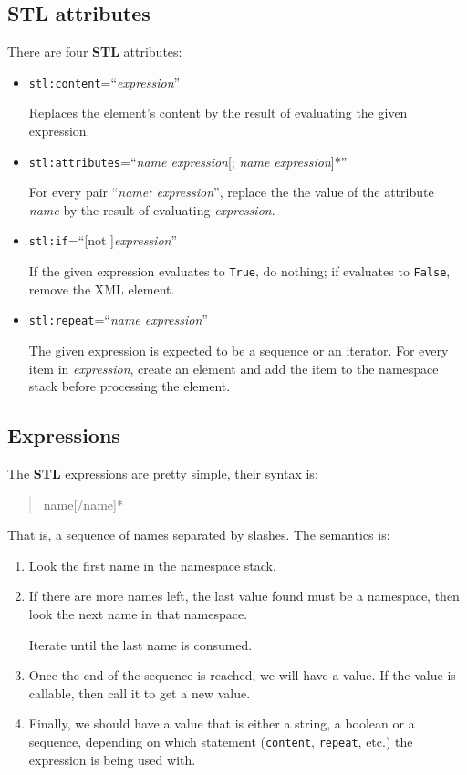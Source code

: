 \subsection{STL attributes}

There are four {\bf STL} attributes:

\begin{itemize}
  \item {\tt stl:content}=``{\em expression}''

    Replaces the element's
    content by the result of evaluating the given expression.

  \item {\tt stl:attributes}=``{\em name expression}[; {\em name expression}]*''

    For every pair ``{\em name: expression}'', replace the the value of
    the attribute {\em name} by the result of evaluating {\em expression}.

  \item {\tt stl:if}=``[not ]{\em expression}''

    If the given expression evaluates to {\tt True}, do nothing; if
    evaluates to {\tt False}, remove the XML element.

  \item {\tt stl:repeat}=``{\em name expression}''

    The given expression is expected to be a sequence or an iterator.
    For every item in {\em expression}, create an element and add the
    item to the namespace stack before processing the element.
\end{itemize}


\subsection{Expressions}

The {\bf STL} expressions are pretty simple, their syntax is:

\begin{quote}
    name[/name]*
\end{quote}

That is, a sequence of names separated by slashes. The semantics is:

\begin{enumerate}
  \item Look the first name in the namespace stack.

  \item If there are more names left, the last value found must be a namespace,
    then look the next name in that namespace.

    Iterate until the last name is consumed.

  \item Once the end of the sequence is reached, we will have a value. If
    the value is callable, then call it to get a new value.

  \item Finally, we should have a value that is either a string, a boolean
    or a sequence, depending on which statement ({\tt content}, {\tt repeat},
    etc.) the expression is being used with.
\end{enumerate}



